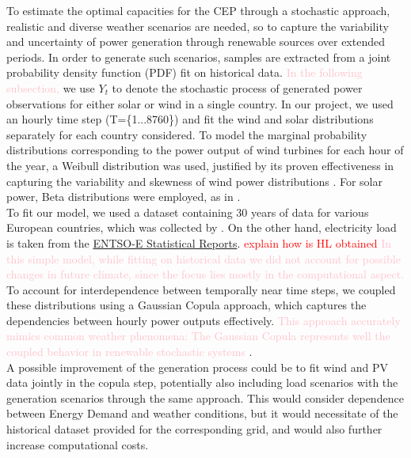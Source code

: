 To estimate the optimal capacities for the CEP through a stochastic approach, realistic and diverse weather scenarios are needed, so to capture the variability and uncertainty of power generation through renewable sources over extended periods. 
In order to generate such scenarios, samples are extracted from a joint probability density function (PDF) fit on historical data. \textcolor{pink}{In the following subsection,} we use \(Y_t\) to denote the stochastic process of generated power observations for either solar or wind in a single country.
In our project, we used an hourly time step (T=\{1...8760\}) and fit the wind and solar distributions separately for each country considered.
To model the marginal probability distributions corresponding to the power output of wind turbines for each hour of the year, a Weibull distribution was used, justified by its proven effectiveness in capturing the variability and skewness of wind power distributions \textcolor{green}{\cite{weibullwind}}. 
For solar power, Beta distributions were employed, as in \textcolor{green}{\cite{betaPV}}. \\
\indent  To fit our model, we used a dataset containing 30 years of data for various European countries, which was collected by \textcolor{green}{\cite{30y_gen}}. 
On the other hand, electricity load is taken from the \textcolor{green}{\href{https://www.entsoe.eu/data/power-stats/}{ENTSO-E Statistical Reports}}. \textcolor{red}{explain how is HL obtained}
\textcolor{pink}{In this simple model, while fitting on historical data we did not account for possible changes in future climate, since the focus lies mostly in the computational aspect.}\\
To account for interdependence between temporally near time steps, we coupled these distributions using a Gaussian Copula approach, which captures the dependencies between hourly power outputs effectively. \textcolor{pink}{This approach accurately mimics common weather phenomena: The Gaussian Copula represents well the coupled behavior in renewable stochastic systems} \textcolor{green}{\cite{GaussCopula}}. \\
\indent A possible improvement of the generation process could be to fit wind and PV data jointly in the copula step, potentially also including load scenarios with the generation scenarios through the same approach. This would consider dependence between Energy Demand and weather conditions, but it would necessitate of the historical dataset provided for the corresponding grid, and would also further increase computational costs.


